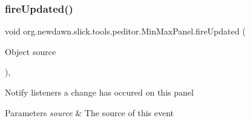 \subsubsection{\texorpdfstring{fire\+Updated()}{fireUpdated()}}
{\footnotesize\ttfamily void org.\+newdawn.\+slick.\+tools.\+peditor.\+Min\+Max\+Panel.\+fire\+Updated (\begin{DoxyParamCaption}\item[{Object}]{source }\end{DoxyParamCaption})\hspace{0.3cm}{\ttfamily [inline]}, {\ttfamily [package]}}

Notify listeners a change has occured on this panel


\begin{DoxyParams}{Parameters}
{\em source} & The source of this event \\
\hline
\end{DoxyParams}

